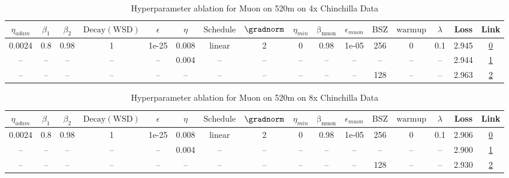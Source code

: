 \begin{table}[H]
\centering
\caption{Hyperparameter ablation for Muon on 520m on 4x Chinchilla Data}
\label{tab:ablation_muon_520m_on_4x_chinchilla_data}
\begin{tabular}{cccccccccccccccc}
\toprule
$\eta_{adam}$ & $\beta_1$ & $\beta_2$ & $\mathrm{Decay (WSD)}$ & $\epsilon$ & $\eta$ & $\mathrm{Schedule}$ & $\gradnorm$ & $\eta_{min}$ & $\mathrm{\beta_{muon}}$ & $\epsilon_{muon}$ & $\mathrm{BSZ}$ & $\mathrm{warmup}$ & $\lambda$ & Loss & Link \\
\midrule
0.0024 & 0.8 & 0.98 & 1 & 1e-25 & 0.008 & linear & 2 & 0 & 0.98 & 1e-05 & 256 & 0 & 0.1 & 2.945 & \href{https://wandb.ai/stanford-mercury/optimizer-scaling/runs/sweep-520m-42B-muon92eab1lr0.008-wd0.1-minlr0-warmup0-b10.8-b20.-f2fd04}{0} \\
\midrule
-- & -- & -- & -- & -- & 0.004 & -- & -- & -- & -- & -- & -- & -- & -- & 2.944 & \href{https://wandb.ai/stanford-mercury/optimizer-scaling/runs/sweep-520m-42B-muonrde8a35lr0.004-wd0.1-minlr0-warmup0-b10.8-b20-0393ec}{1} \\
-- & -- & -- & -- & -- & -- & -- & -- & -- & -- & -- & 128 & -- & -- & 2.963 & \href{https://wandb.ai/stanford-mercury/optimizer-scaling/runs/sweep-520m-42B-muonc58c06lr0.008-wd0.1-minlr0-warmup0-b10.8-b20.-dfd7f2}{2} \\
\bottomrule
\end{tabular}
\end{table}

\begin{table}[H]
\centering
\caption{Hyperparameter ablation for Muon on 520m on 8x Chinchilla Data}
\label{tab:ablation_muon_520m_on_8x_chinchilla_data}
\begin{tabular}{cccccccccccccccc}
\toprule
$\eta_{adam}$ & $\beta_1$ & $\beta_2$ & $\mathrm{Decay (WSD)}$ & $\epsilon$ & $\eta$ & $\mathrm{Schedule}$ & $\gradnorm$ & $\eta_{min}$ & $\mathrm{\beta_{muon}}$ & $\epsilon_{muon}$ & $\mathrm{BSZ}$ & $\mathrm{warmup}$ & $\lambda$ & Loss & Link \\
\midrule
0.0024 & 0.8 & 0.98 & 1 & 1e-25 & 0.008 & linear & 2 & 0 & 0.98 & 1e-05 & 256 & 0 & 0.1 & 2.906 & \href{https://wandb.ai/stanford-mercury/optimizer-scaling/runs/sweep-520m-85B-muongc58c06lr0.008-wd0.1-minlr0-warmup0-b10.8-b20-498482}{0} \\
\midrule
-- & -- & -- & -- & -- & 0.004 & -- & -- & -- & -- & -- & -- & -- & -- & 2.900 & \href{https://wandb.ai/stanford-mercury/optimizer-scaling/runs/sweep-520m-85B-muong0ea950lr0.004-wd0.1-minlr0-warmup0-b10.8-b20-9ac240}{1} \\
-- & -- & -- & -- & -- & -- & -- & -- & -- & -- & -- & 128 & -- & -- & 2.930 & \href{https://wandb.ai/stanford-mercury/optimizer-scaling/runs/sweep-520m-85B-muong1d8a02lr0.008-wd0.1-minlr0-warmup0-b10.8-b20-913852}{2} \\
\bottomrule
\end{tabular}
\end{table}


